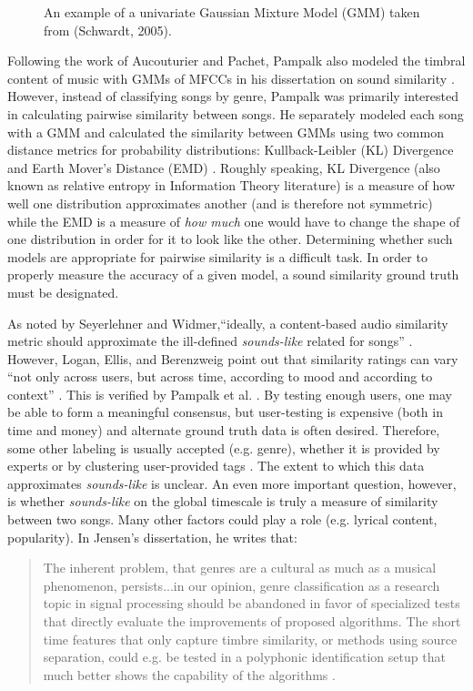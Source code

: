 \documentclass[a4paper,12pt]{report} 	%
\numberwithin{figure}{chapter}
\numberwithin{table}{chapter}
\numberwithin{equation}{chapter}
\begin{document}
\begin{flushleft}
\begin{figure}[h!]
\begin{center}
\caption[Gaussian Mixture Models]{An example of a univariate Gaussian Mixture Model (GMM) taken from (Schwardt, 2005).}
\end{center}
\end{figure}
Following the work of Aucouturier and Pachet, Pampalk also modeled the timbral content of music with GMMs of MFCCs in his dissertation on sound similarity \cite{Pampalk:2006pr}. However, instead of classifying songs by genre, Pampalk was primarily interested in calculating pairwise similarity between songs. He separately modeled each song with a GMM and calculated the similarity between GMMs using two common distance metrics for probability distributions: Kullback-Leibler (KL) Divergence and Earth Mover's Distance (EMD) \cite[p. 26]{Pampalk:2006pr}. Roughly speaking, KL Divergence (also known as relative entropy in Information Theory literature) is a measure of how well one distribution approximates another (and is therefore not symmetric) while the EMD is a measure of \emph{how much} one would have to change the shape of one distribution in order for it to look like the other. Determining whether such models are appropriate for pairwise similarity is a difficult task. In order to properly measure the accuracy of a given model, a sound similarity ground truth must be designated.

As noted by Seyerlehner and Widmer,``ideally, a content-based audio similarity metric should approximate the ill-defined \emph{sounds-like} related for songs'' \cite[p. 1]{Seyerlehner:2008tw}. However, Logan, Ellis, and Berenzweig point out that similarity ratings can vary ``not only across users, but across time, according to mood and according to context'' \cite[p. 1]{Logan:2003cr}. This is verified by Pampalk et al. \cite[p. 6]{Pampalk:2008xz}. By testing enough users, one may be able to form a meaningful consensus, but user-testing is expensive (both in time and money) and alternate ground truth data is often desired. Therefore, some other labeling is usually accepted (e.g. genre), whether it is provided by experts or by clustering user-provided tags \cite[p. 2]{Logan:2003cr}. The extent to which this data approximates \emph{sounds-like} is unclear. An even more important question, however, is whether \emph{sounds-like} on the global timescale is truly a measure of similarity between two songs. Many other factors could play a role (e.g. lyrical content, popularity). In Jensen's dissertation, he writes that:

\selectfont
\begin{quote} The inherent problem, that genres are a cultural as much as a musical phenomenon, persists...in our opinion, genre classification as a research topic in signal processing should be abandoned in favor of specialized tests that directly evaluate the improvements of proposed algorithms. The short time features that only capture timbre similarity, or methods using source separation, could e.g. be tested in a polyphonic identification setup that much better shows the capability of the algorithms \cite[p. 11]{Jensen:2009ta}.
\end{quote}
\selectfont


\end{flushleft}
\end{document}

